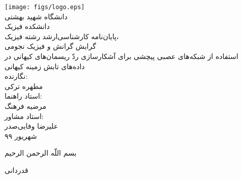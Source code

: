 \documentclass[a4paper,titlepage,12pt,fleqn,oneside]{report}
\begin{document}
\begin{titlepage}
   \begin{center}
      \texttt{[image: figs/logo.eps]}\\
      \vspace{0.2cm}
      {\large دانشگاه شهید بهشتی}\\
      {\large دانشکده فیزیک}\\
      \vspace{0.6cm}
      {\Large پایان‌نامه کارشناسی‌ارشد رشته فیزیک،\\ گرایش گرانش و فیزیک نجومی}\\
      \vspace{0.6cm}
      {\LARGE
      \vspace{0.5cm}
استفاده از شبکه‌های عصبی پیچشی برای آشکارسازی 
      \vspace{0.52cm}
ردّ ریسمان‌های کیهانی در داده‌های تابش زمینه کیهانی 
}\\ 
      \vspace{0.7cm}
      {\large نگارنده:}\\
      {\Large مطهره ترکی}\\
      \vspace{0.5cm}
      {\large استاد راهنما:}\\
      {\Large  مرضیه فرهنگ}\\
      \vspace{0.5cm}
      {\large استاد مشاور:}\\
      {\Large  علیرضا وفایی‌صدر}\\
      \vspace{1cm}
      {\large  شهریور ۹۹} \\
      \vspace{0.5cm}
   \end{center}
\end{titlepage}


 
 

\newpage
\begin{center}
{\Huge
	بسم اللّه الرحمن الرحیم

}
\end{center}
\newpage
\begin{center}
{\Huge
قدردانی
}
\end{center}
\vspace{2.5cm}
\par
\end{document}
